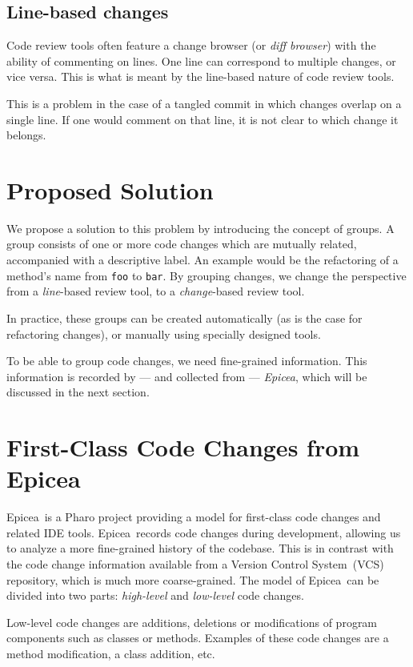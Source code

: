 \documentclass[conference,a4paper]{IEEEtran}
\newcommand{\Ep}{Epicea}
\newcommand{\code}[1]{\texttt{#1}}
\begin{document}
\subsection{Line-based changes}
\label{sec:line-based-changes}
Code review tools often feature a change browser (or \textit{diff
  browser}) with the ability of commenting on lines. One line can
correspond to multiple changes, or vice versa. This is what is meant
by the line-based nature of code review tools.

This is a problem in the case of a tangled commit in which changes
overlap on a single line. If one would comment on that line, it is not
clear to which change it belongs.

\section{Proposed Solution}
\label{sec:proposed-solution}
We propose a solution to this problem by introducing the concept of
groups. A group consists of one or more code changes which are
mutually related, accompanied with a descriptive label. An example
would be the refactoring of a method's name from \code{foo} to
\code{bar}. By grouping changes, we change the perspective from a
\textit{line}-based review tool, to a \textit{change}-based review
tool.

In practice, these groups can be created automatically (as is the case
for refactoring changes), or manually using specially designed tools.

To be able to group code changes, we need fine-grained
information. This information is recorded by --- and collected from
--- \textit{\Ep}, which will be discussed in the next section.

\section{First-Class Code Changes from \Ep}
\label{sec:first-class-ide}
\Ep\ is a Pharo project providing a model for first-class code changes
and related IDE tools. \Ep\ records code changes during development,
allowing us to analyze a more fine-grained history of the
codebase. This is in contrast with the code change information
available from a Version Control System\ (VCS) repository, which is
much more coarse-grained. The model of \Ep\ can be divided into two
parts: \textit{high-level} and \textit{low-level} code changes.

Low-level code changes are additions, deletions or modifications of
program components such as classes or methods. Examples of these code
changes are a method modification, a class addition, etc.
\end{document}
